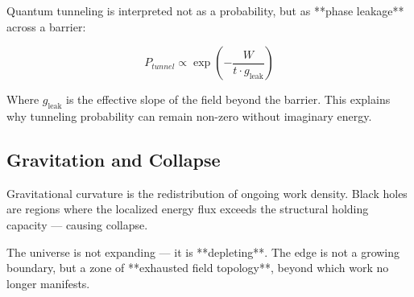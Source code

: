 Quantum tunneling is interpreted not as a probability, but as **phase leakage** across a barrier:

\[
P_{tunnel} \propto \exp\left(-\frac{W}{t \cdot g_{\text{leak}}}\right)
\]

Where \( g_{\text{leak}} \) is the effective slope of the field beyond the barrier. This explains why tunneling probability can remain non-zero without imaginary energy.

\subsection{Gravitation and Collapse}

Gravitational curvature is the redistribution of ongoing work density.  
Black holes are regions where the localized energy flux exceeds the structural holding capacity — causing collapse.

The universe is not expanding — it is **depleting**.  
The edge is not a growing boundary, but a zone of **exhausted field topology**, beyond which work no longer manifests.
